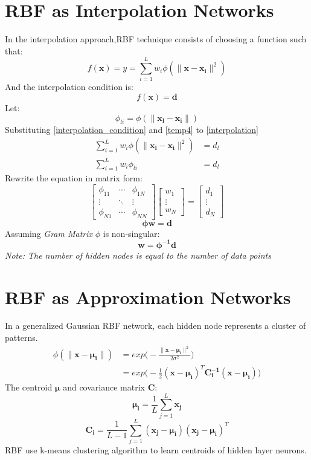 \section{RBF as Interpolation Networks}
In the interpolation approach,RBF technique consists of choosing a function such that:
\begin{equation}
f(\mathbf{x}) = y = \sum_{i=1}^{L} w_i \phi(\| \mathbf{x - x_{i}} \|^{2})
\label{interpolation}
\end{equation}
And the interpolation condition is:
\begin{equation}
f(\mathbf{x}) = \mathbf{d}
\label{interpolation_condition}
\end{equation}
Let:
\begin{equation}
\phi_{li} = \phi(\| \mathbf{x_l - x_i} \|)
\label{temp4}
\end{equation}
Substituting \ref{interpolation_condition} and \ref{temp4} to \ref{interpolation}
\begin{equation}
\begin{split}
\sum_{i=1}^{L} w_i \phi(\| \mathbf{x_l - x_{i}} \|^{2}) &= d_l \\
\sum_{i=1}^{L} w_i \phi_{li} &= d_l
\end{split}
\end{equation}
Rewrite the equation in matrix form:
$$
\begin{bmatrix}
\phi_{11}  & \cdots & \phi_{1N} \\
\vdots     & \ddots & \vdots \\
\phi_{N1}  & \cdots & \phi_{NN}   
\end{bmatrix}
\begin{bmatrix}
w_1 \\
\vdots \\
w_N
\end{bmatrix} = 
\begin{bmatrix}
d_1 \\
\vdots \\
d_N
\end{bmatrix}
$$
$$\pmb{\phi w = d}$$
Assuming \emph{Gram Matrix} $\phi$ is non-singular:
$$\pmb{w = \phi^{-1} d}$$
\textit{Note: The number of hidden nodes is equal to the number of data points}

\section{RBF as Approximation Networks}
In a generalized Gaussian RBF network, each hidden node represents a cluster of patterns. 
\begin{equation}
\begin{split}
\phi(\| \mathbf{x} - \pmb{\mu_{i}}\|) &= exp\Big(-\frac{\| \mathbf{x} - \pmb{\mu_{i}} \|^{2}}{2 \sigma^{2}} \Big) \\
&= exp\Big(- \frac{1}{2} (\mathbf{x} - \pmb{\mu_i})^{T} \mathbf{C_i^{-1}} (\mathbf{x} - \pmb{\mu_i}) \Big)
\end{split}
\end{equation}
The centroid $\pmb{\mu}$ and covariance matrix $\mathbf{C}$: 
$$\pmb{\mu_{i}} = \frac{1}{L} \sum_{j=1}^{L} \mathbf{x_j}$$
$$\mathbf{C_i} = \frac{1}{L-1} \sum_{j=1}^{L} (\mathbf{x_j} - \pmb{\mu_i})(\mathbf{x_j} - \pmb{\mu_i})^{T}$$
RBF use k-means clustering algorithm to learn centroids of hidden layer neurons. 